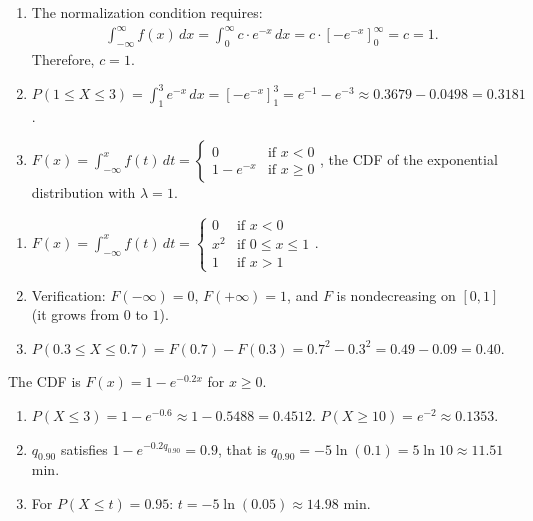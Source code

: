 \begin{solproblema}[prob:14b3125]
	\begin{enumerate}
		\item The normalization condition requires:
		\begin{align*}
			\int_{-\infty}^{\infty} f(x)\,dx = \int_{0}^{\infty} c \cdot e^{-x}\,dx = c \cdot [-e^{-x}]_{0}^{\infty} = c = 1.
		\end{align*}
		Therefore, $c = 1$.
		\item $P(1 \le X \le 3) = \int_{1}^{3} e^{-x}\,dx = [-e^{-x}]_{1}^{3} = e^{-1} - e^{-3} \approx 0.3679 - 0.0498 = 0.3181$.
		\item $F(x) = \int_{-\infty}^{x} f(t)\,dt = \begin{cases} 0 & \text{if } x < 0 \\ 1 - e^{-x} & \text{if } x \ge 0 \end{cases}$, the CDF of the exponential distribution with $\lambda=1$.
	\end{enumerate}
\end{solproblema}

\begin{solproblema}[prob:287c45c]
	\begin{enumerate}
		\item $F(x) = \int_{-\infty}^{x} f(t)\,dt = \begin{cases} 0 & \text{if } x < 0 \\ x^{2} & \text{if } 0 \le x \le 1 \\ 1 & \text{if } x > 1 \end{cases}$.
		\item Verification: $F(-\infty)=0$, $F(+\infty)=1$, and $F$ is nondecreasing on $[0,1]$ (it grows from $0$ to $1$).
		\item $P(0.3 \le X \le 0.7) = F(0.7)-F(0.3) = 0.7^2-0.3^2 = 0.49-0.09=0.40$.
	\end{enumerate}
\end{solproblema}

\begin{solproblema}[prob:61a9dd8]
	The CDF is $F(x) = 1 - e^{-0.2x}$ for $x \ge 0$.
	\begin{enumerate}
		\item $P(X \le 3) = 1-e^{-0.6}\approx1-0.5488=0.4512$. $P(X\ge10)=e^{-2}\approx0.1353$.
		\item $q_{0.90}$ satisfies $1-e^{-0.2q_{0.90}}=0.9$, that is $q_{0.90}=-5\ln(0.1)=5\ln10\approx11.51$ min.
		\item For $P(X\le t)=0.95$: $t=-5\ln(0.05)\approx14.98$ min.
	\end{enumerate}
\end{solproblema}

